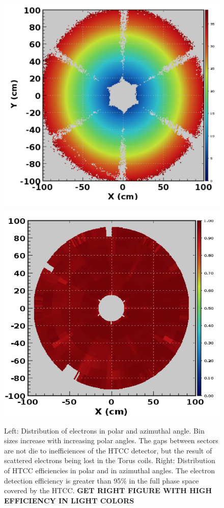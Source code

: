 \documentclass[final,3p,times,twocolumn,authoryear]{elsarticle}
\begin{document}
\begin{figure}[htbp!]
{\includegraphics[width=1.0\columnwidth]{htcc-dis.png}}
{\includegraphics[width=1.0\columnwidth]{htcc-eff.png}}
\caption{ Left: Distribution of electrons in polar and azimuthal angle. Bin sizes increase with increasing polar angles. The 
gaps between sectors are not die to inefficiences of the HTCC detector, but the result of scattered electrons being lost in the 
Torus coils. 
Right: Distribution of HTCC efficiencies in polar and in azimuthal angles. The electron detection efficiency is greater than 95\% 
in the full phase space covered by the HTCC. {\bf GET RIGHT FIGURE WITH HIGH EFFICIENCY IN LIGHT COLORS}  } 
\label{htcc-eff}
\end{figure}
\end{document}
